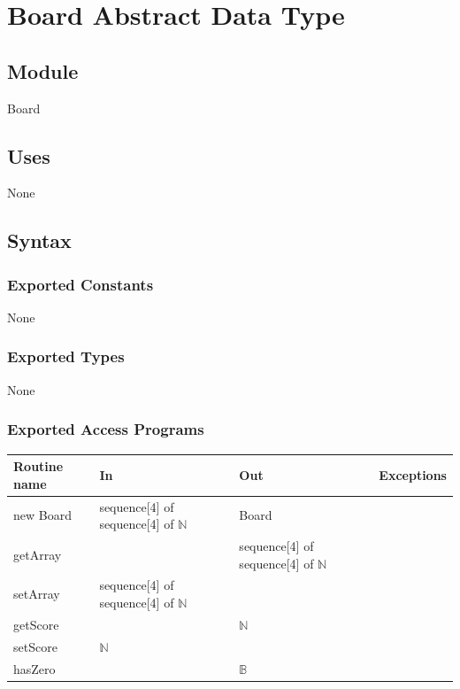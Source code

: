 \documentclass[12pt]{article}
\begin{document}
\section* {Board Abstract Data Type}

\subsection*{Module}

Board

\subsection* {Uses}

None

\subsection* {Syntax}

\subsubsection* {Exported Constants}

None

\subsubsection* {Exported Types}

None

\subsubsection* {Exported Access Programs}

\begin{tabular}{| l | l | l | p{5cm} |}
\hline
\textbf{Routine name} & \textbf{In} & \textbf{Out} & \textbf{Exceptions}\\
\hline
new Board & sequence[4] of sequence[4] of $\mathbb{N}$ & Board & \\
\hline
getArray & & sequence[4] of sequence[4] of $\mathbb{N}$ & ~\\
\hline
setArray & sequence[4] of sequence[4] of $\mathbb{N}$ & & ~\\
\hline
getScore & & $\mathbb{N}$ &~\\
\hline 
setScore & $\mathbb{N}$ & & ~\\
\hline
hasZero & & $\mathbb{B}$ &~\\
\hline
\end{tabular}
\end{document}
